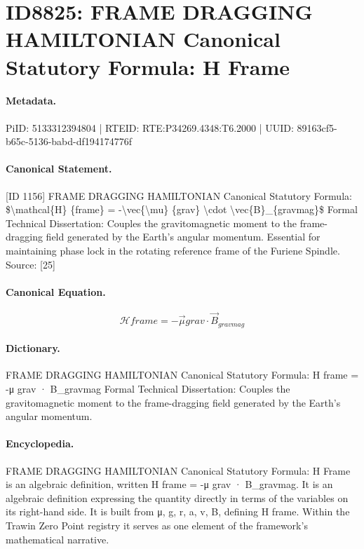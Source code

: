 \section*{ID8825: FRAME DRAGGING HAMILTONIAN Canonical Statutory Formula: H Frame}
\paragraph{Metadata.}
PiID: 5133312394804 | RTEID: RTE:P34269.4348:T6.2000 | UUID: 89163cf5-b65c-5136-babd-df194174776f

\paragraph{Canonical Statement.}
[ID 1156] FRAME DRAGGING HAMILTONIAN Canonical Statutory Formula: \$\textbackslash{}mathcal\{H\} \{frame\} = -\textbackslash{}vec\{\textbackslash{}mu\} \{grav\} \textbackslash{}cdot \textbackslash{}vec\{B\}\_\{gravmag\}\$ Formal Technical Dissertation: Couples the gravitomagnetic moment to the frame-dragging field generated by the Earth's angular momentum. Essential for maintaining phase lock in the rotating reference frame of the Furiene Spindle. Source: [25]

\paragraph{Canonical Equation.}
\[
\mathcal{H} {frame} = -\vec{\mu} {grav} \cdot \vec{B}_{gravmag}
\]

\paragraph{Dictionary.}
FRAME DRAGGING HAMILTONIAN Canonical Statutory Formula: H frame = -μ grav · B\_gravmag Formal Technical Dissertation: Couples the gravitomagnetic moment to the frame-dragging field generated by the Earth's angular momentum.

\paragraph{Encyclopedia.}
FRAME DRAGGING HAMILTONIAN Canonical Statutory Formula: H Frame is an algebraic definition, written H frame = -μ grav · B\_gravmag. It is an algebraic definition expressing the quantity directly in terms of the variables on its right-hand side. It is built from μ, g, r, a, v, B, defining H frame. Within the Trawin Zero Point registry it serves as one element of the framework's mathematical narrative.
